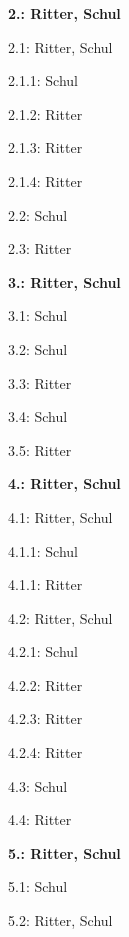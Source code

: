 \documentclass[12pt]{report}
\begin{document}
\begin{center}
\begin{multicols}{2}
\begin{compactitem}
\item[] \textbf{2.: Ritter, Schul}
\begin{compactitem}
\item[] 2.1: Ritter, Schul
\begin{compactitem}
\item[] 2.1.1: Schul
\item[] 2.1.2: Ritter
\item[] 2.1.3: Ritter
\item[] 2.1.4: Ritter
\end{compactitem}
\item[] 2.2: Schul
\item[] 2.3: Ritter
\end{compactitem}
\item[] \textbf{3.: Ritter, Schul}
\begin{compactitem}
\item[] 3.1: Schul
\item[] 3.2: Schul
\item[] 3.3: Ritter
\item[] 3.4: Schul
\item[] 3.5: Ritter
\end{compactitem}
\vspace{12pt}
\item[] \textbf{4.: Ritter, Schul}
\begin{compactitem}
\item[] 4.1: Ritter, Schul
\begin{compactitem}
\item[] 4.1.1: Schul
\item[] 4.1.1: Ritter
\end{compactitem}
\item[] 4.2: Ritter, Schul
\begin{compactitem}
\item[] 4.2.1: Schul
\item[] 4.2.2: Ritter
\item[] 4.2.3: Ritter
\item[] 4.2.4: Ritter
\end{compactitem}
\item[] 4.3: Schul
\item[] 4.4: Ritter
\end{compactitem}
\item[] \textbf{5.: Ritter, Schul}
\begin{compactitem}
\item[] 5.1: Schul
\item[] 5.2: Ritter, Schul

\end{compactitem}
\end{compactitem}
\end{multicols}
\end{center}
\end{document}
